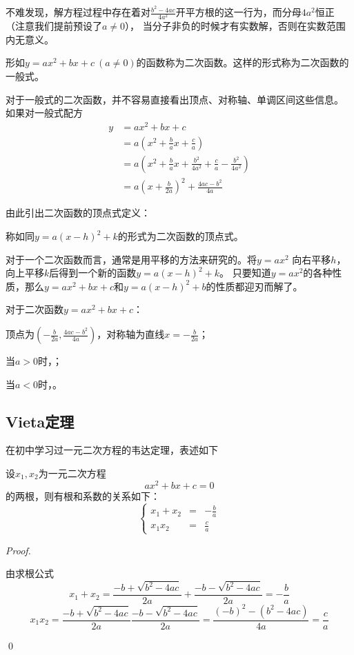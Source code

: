 不难发现，解方程过程中存在着对\(\frac{b^2-4ac}{4a^2}\)开平方根的这一行为，而分母\(4a^2\)恒正（注意我们提前预设了\(a\neq0\)），
当分子非负的时候才有实数解，否则在实数范围内无意义。

\begin{definition}[二次函数]
    形如\(y=ax^2+bx+c\ (a\neq0)\)的函数称为二次函数。这样的形式称为二次函数的一般式。
\end{definition}

对于一般式的二次函数，并不容易直接看出顶点、对称轴、单调区间这些信息。
如果对一般式配方
\begin{align*}
    y&=ax^2+bx+c\\
    &=a(x^2+\frac{b}{a}x+\frac{c}{a})\\
    &=a(x^2+\frac{b}{a}x+\frac{b^2}{4a^2}+\frac{c}{a}-\frac{b^2}{4a^2})\\
    &=a(x+\frac{b}{2a})^2+\frac{4ac-b^2}{4a}
\end{align*}

由此引出二次函数的顶点式定义：
\begin{definition}
    称如同\(y=a(x-h)^2+k\)的形式为二次函数的顶点式。
\end{definition}
对于一个二次函数而言，通常是用平移的方法来研究的。将\(y=ax^2\)
向右平移\(h\)，向上平移\(k\)后得到一个新的函数\(y=a(x-h)^2+k\)。
只要知道\(y=ax^2\)的各种性质，那么\(y=ax^2+bx+c\)和\(y=a(x-h)^2+b\)的性质都迎刃而解了。

\begin{character}
    对于二次函数\(y=ax^2+bx+c\)：

    顶点为\((-\frac{b}{2a},\frac{4ac-b^2}{4a})\)，对称轴为直线\(x=-\frac{b}{2a}\)；

    当\(a>0\)时，；

    当\(a<0\)时，。
\end{character}

\clearpage
\subsection{Vieta定理}
在初中学习过一元二次方程的韦达定理，表述如下
\begin{theorem}[Vieta定理]
    设\(x_1,x_2\)为一元二次方程\[ax^2+bx+c=0\]的两根，则有根和系数的关系如下：
    \[
\left\{
\begin{array}{ccc}
  x_1 + x_2 & = &\displaystyle -\frac{b}{a} \\
  x_1 x_2   & = &\displaystyle \frac{c}{a}
\end{array}
\right.
\]%
 
\end{theorem}
\begin{proof}
    \begin{way1}
        由求根公式
        \[x_1+x_2=\frac{-b+ \sqrt{b^2-4ac}}{2a}+\frac{-b-\sqrt{b^2-4ac}}{2a}=-\frac{b}{a}\]
        \[x_1x_2=\frac{-b+ \sqrt{b^2-4ac}}{2a}\frac{-b-\sqrt{b^2-4ac}}{2a}=\frac{(-b)^2-(b^2-4ac)}{4a}=\frac{c}{a}\]
    \end{way1}
    \begin{way2}

    \end{way2}

    \qed
\end{proof}


